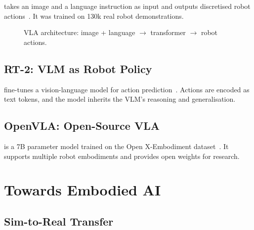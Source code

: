  takes an image and a language instruction as input and outputs discretised robot actions~\cite{Brohan2022RT1}. It was trained on 130k real robot demonstrations.

\begin{figure}
\centering
{}
\caption{VLA architecture: image + language $\to$ transformer $\to$ robot actions.}
\label{fig:vla}
\end{figure}

\subsection{RT-2: VLM as Robot Policy}

 fine-tunes a vision-language model for action prediction~\cite{Brohan2023RT2}. Actions are encoded as text tokens, and the model inherits the VLM's reasoning and generalisation.

\subsection{OpenVLA: Open-Source VLA}

 is a 7B parameter model trained on the Open X-Embodiment dataset~\cite{Kim2024OpenVLA}. It supports multiple robot embodiments and provides open weights for research.


\section{Towards Embodied AI}


\subsection{Sim-to-Real Transfer}

